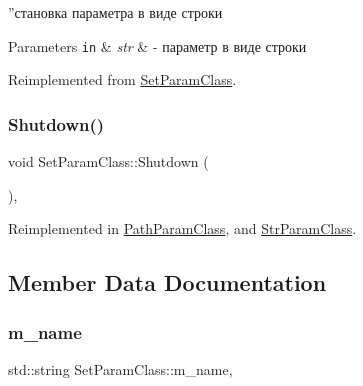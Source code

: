 ”становка параметра в виде строки 


\begin{DoxyParams}[1]{Parameters}
\mbox{\tt in}  & {\em str} & -\/ параметр в виде строки \\
\hline
\end{DoxyParams}


Reimplemented from \hyperlink{class_set_param_class_aabba4e8a9b148582f40486e662408bf9}{Set\+Param\+Class}.

\mbox{\label{class_set_param_class_afdb63374ca8c32f6678ba34e050e9071}} 
\subsubsection{\texorpdfstring{Shutdown()}{Shutdown()}}
{\footnotesize\ttfamily void Set\+Param\+Class\+::\+Shutdown (\begin{DoxyParamCaption}{ }\end{DoxyParamCaption})\hspace{0.3cm}{\ttfamily [virtual]}, {\ttfamily [inherited]}}



Reimplemented in \hyperlink{class_path_param_class_a24f272557eaa32ca6ee758932a7e5a97}{Path\+Param\+Class}, and \hyperlink{class_str_param_class_ae84185574803c2877e3b1b21a70fa6ac}{Str\+Param\+Class}.



\subsection{Member Data Documentation}
\mbox{\label{class_set_param_class_aab204889210304af482b414a6f8dbe82}} 
\subsubsection{\texorpdfstring{m\+\_\+name}{m\_name}}
{\footnotesize\ttfamily std\+::string Set\+Param\+Class\+::m\+\_\+name\hspace{0.3cm}{\ttfamily [protected]}, {\ttfamily [inherited]}}



